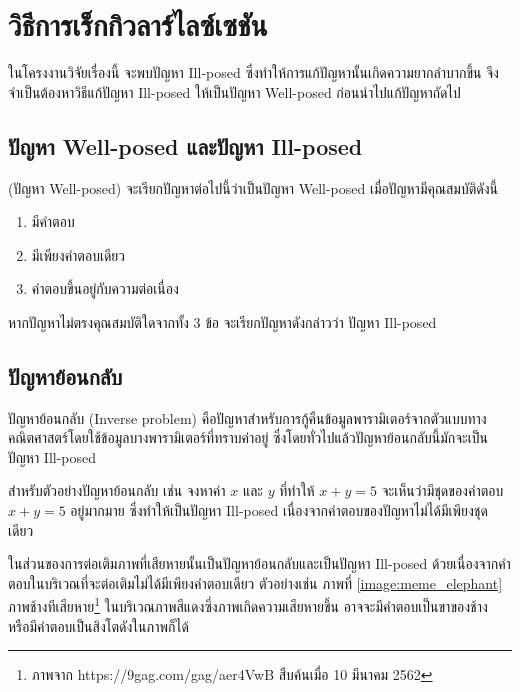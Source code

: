\section{วิธีการเร็กกิวลาร์ไลซ์เซชัน}

\hspace{1cm} ในโครงงานวิจัยเรื่องนี้ จะพบปัญหา Ill-posed ซึ่งทำให้การแก้ปัญหานั้นเกิดความยากลำบากขึ้น จึงจำเป็นต้องหาวิธีแก้ปัญหา Ill-posed ให้เป็นปัญหา Well-posed ก่อนนำไปแก้ปัญหาถัดไป

\subsection{ปัญหา Well-posed และปัญหา Ill-posed}

\begin{Definition}
    (ปัญหา Well-posed) จะเรียกปัญหาต่อไปนี้ว่าเป็นปัญหา Well-posed เมื่อปัญหามีคุณสมบัติดังนี้
    \begin{enumerate}
        \item มีคำตอบ
        \item มีเพียงคำตอบเดียว
        \item คำตอบขึ้นอยู่กับความต่อเนื่อง
    \end{enumerate}    
    หากปัญหาไม่ตรงคุณสมบัติใดจากทั้ง 3 ข้อ จะเรียกปัญหาดังกล่าวว่า ปัญหา Ill-posed
\end{Definition}

\subsection{ปัญหาย้อนกลับ}
\hspace{1cm}ปัญหาย้อนกลับ (Inverse problem) คือปัญหาสำหรับการกู้คืนข้อมูลพารามิเตอร์จากตัวแบบทางคณิตศาสตร์โดยใช้ข้อมูลบางพารามิเตอร์ที่ทราบค่าอยู่ ซึ่งโดยทั่วไปแล้วปัญหาย้อนกลับนี้มักจะเป็นปัญหา Ill-posed

\begin{Example}
    \hspace{1cm} สำหรับตัวอย่างปัญหาย้อนกลับ เช่น จงหาค่า $x$ และ $y$ ที่ทำให้ $x+y = 5$ จะเห็นว่ามีชุดของคำตอบ $x+y=5$ อยู่มากมาย ซึ่งทำให้เป็นปัญหา Ill-posed เนื่องจากคำตอบของปัญหาไม่ได้มีเพียงชุดเดียว
    \label{example:x_plus_y_5}
\end{Example}

\hspace{1cm} ในส่วนของการต่อเติมภาพที่เสียหายนั้นเป็นปัญหาย้อนกลับและเป็นปัญหา Ill-posed ด้วยเนื่องจากคำตอบในบริเวณที่จะต่อเติมไม่ได้มีเพียงคำตอบเดียว ตัวอย่างเช่น ภาพที่ \ref{image:meme_elephant} ภาพช้างทีเสียหาย\footnote{ภาพจาก https://9gag.com/gag/aer4VwB สืบค้นเมื่อ 10 มีนาคม 2562} ในบริเวณภาพสีแดงซึ่งภาพเกิดความเสียหายขึ้น อาจจะมีคำตอบเป็นขาของช้าง หรือมีคำตอบเป็นสิงโตดังในภาพก็ได้

